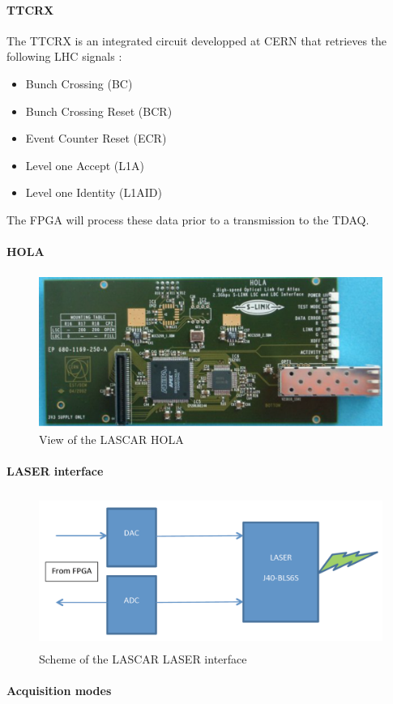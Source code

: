 \paragraph{TTCRX}

The TTCRX is an integrated circuit developped at CERN that retrieves the following LHC signals :
\begin{itemize}
\item Bunch Crossing (BC)
\item Bunch Crossing Reset (BCR)
\item Event Counter Reset (ECR)
\item Level one Accept (L1A)
\item Level one Identity (L1AID)
\end{itemize}

The FPGA will process these data prior to  a transmission to the TDAQ.

\paragraph{HOLA}


\begin{figure}[htbp]

\centering
\includegraphics[height=5cm]{figures/hola.pdf}
\caption{View of the LASCAR HOLA}\label{fig:laslascarhola}
\end{figure}

\paragraph{LASER interface}

\begin{figure}[htbp]

\centering
\includegraphics[height=5cm]{figures/laser_interface.pdf}
\caption{Scheme of the LASCAR LASER interface}\label{fig:laslascarlaserint}
\end{figure}

\paragraph{Acquisition modes}